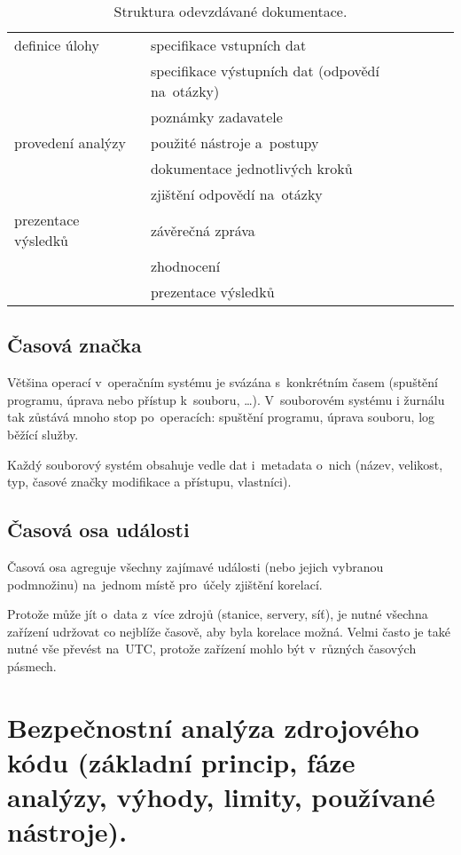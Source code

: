 \begin{table}[ht]
\centering
\onehalfspacing
\begin{tabular}{ll}
definice úlohy
& specifikace vstupních dat \\
& specifikace výstupních dat (odpovědí na~otázky) \\
& poznámky zadavatele \\
\hline
provedení analýzy
& použité nástroje a~postupy \\
& dokumentace jednotlivých kroků \\
& zjištění odpovědí na~otázky \\
\hline
prezentace výsledků
& závěrečná zpráva \\
& zhodnocení \\
& prezentace výsledků \\
\end{tabular}
\caption{Struktura odevzdávané dokumentace.}
\end{table}
\FloatBarrier


\subsection{Časová značka}

Většina operací v~operačním systému je svázána s~konkrétním časem (spuštění programu, úprava nebo přístup k~souboru, \dots).
V~souborovém systému i žurnálu tak zůstává mnoho stop po~operacích: spuštění programu, úprava souboru, log běžící služby.

Každý souborový systém obsahuje vedle dat i~metadata o~nich (název, velikost, typ, časové značky modifikace a přístupu, vlastníci).


\subsection{Časová osa události}

Časová osa agreguje všechny zajímavé události (nebo jejich vybranou podmnožinu) na~jednom místě pro~účely zjištění korelací.

Protože může jít o~data z~více zdrojů (stanice, servery, síť), je nutné všechna zařízení udržovat co nejblíže časově, aby byla korelace možná.
Velmi často je také nutné vše převést na~UTC, protože zařízení mohlo být v~různých časových pásmech.


\clearpage
\section{Bezpečnostní analýza zdrojového kódu (základní princip, fáze analýzy, výhody, limity, používané nástroje).}

